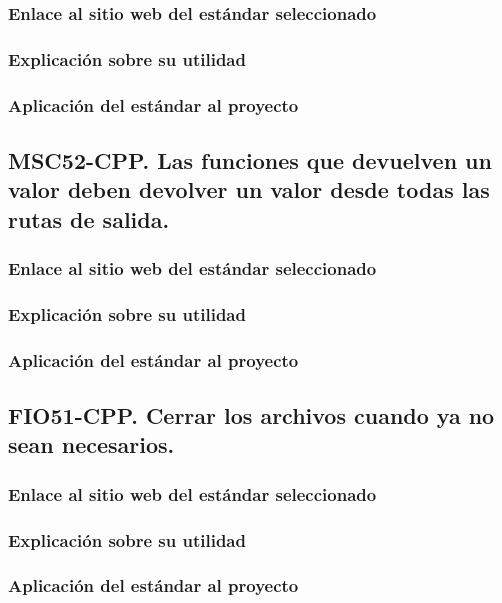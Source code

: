 		\subsubsection{Enlace al sitio web del estándar seleccionado}
		
		\subsubsection{Explicación sobre su utilidad}
		
		\subsubsection{Aplicación del estándar al proyecto}

	\subsection{MSC52-CPP. Las funciones que devuelven un valor deben devolver un valor desde todas las rutas de salida.}
	
		\subsubsection{Enlace al sitio web del estándar seleccionado}
		
		\subsubsection{Explicación sobre su utilidad}
		
		\subsubsection{Aplicación del estándar al proyecto}

	\subsection{FIO51-CPP. Cerrar los archivos cuando ya no sean necesarios.}
	
		\subsubsection{Enlace al sitio web del estándar seleccionado}
		
		\subsubsection{Explicación sobre su utilidad}
		
		\subsubsection{Aplicación del estándar al proyecto}

\newpage